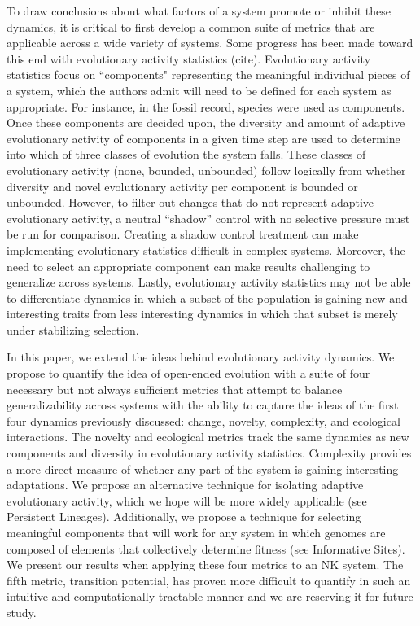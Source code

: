 \documentclass[letterpaper]{article}
\begin{document}
To draw conclusions about what factors of a system promote or inhibit these dynamics, it is critical to first develop a common suite of metrics that are applicable across a wide variety of systems. Some progress has been made toward this end with evolutionary activity statistics (cite). Evolutionary activity statistics focus on ``components" representing the meaningful individual pieces of a system, which the authors admit will need to be defined for each system as appropriate. For instance, in the fossil record, species were used as components. Once these components are decided upon, the diversity and amount of adaptive evolutionary activity of components in a given time step are used to determine into which of three classes of evolution the system falls. These classes of evolutionary activity (none, bounded, unbounded) follow logically from whether diversity and novel evolutionary activity per component is bounded or unbounded. However, to filter out changes that do not represent adaptive evolutionary activity, a neutral ``shadow'' control with no selective pressure must be run for comparison. Creating a shadow control treatment can make implementing evolutionary statistics difficult in complex systems. Moreover, the need to select an appropriate component can make results challenging to generalize across systems. Lastly, evolutionary activity statistics may not be able to differentiate dynamics in which a subset of the population is gaining new and interesting traits from less interesting dynamics in which that subset is merely under stabilizing selection.

In this paper, we extend the ideas behind evolutionary activity dynamics. We propose to quantify the idea of open-ended evolution with a suite of four necessary but not always sufficient metrics that attempt to balance generalizability across systems with the ability to capture the ideas of the first four dynamics previously discussed: change, novelty, complexity, and ecological interactions. The novelty and ecological metrics track the same dynamics as new components and diversity in evolutionary activity statistics. Complexity provides a more direct measure of whether any part of the system is gaining interesting adaptations. We propose an alternative technique for isolating adaptive evolutionary activity, which we hope will be more widely applicable (see Persistent Lineages). Additionally, we propose a technique for selecting meaningful components that will work for any system in which genomes are composed of elements that collectively determine fitness (see Informative Sites). We present our results when applying these four metrics to an NK system.  The fifth metric, transition potential, has proven more difficult to quantify in such an intuitive and computationally tractable manner and we are reserving it for future study.
\end{document}
